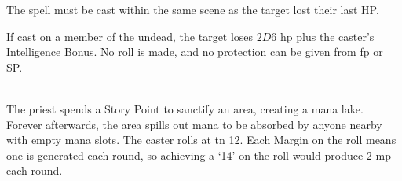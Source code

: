 \begin{multicols}{2}
The spell must be cast within the same scene as the target lost their last HP.

If cast on a member of the undead, the target loses $2D6$ \gls{hp} plus the caster's Intelligence Bonus.
No roll is made, and no protection can be given from \gls{fp} or \gls{SP}.

\\
The priest spends a Story Point to sanctify an area, creating a mana lake.
Forever afterwards, the area spills out mana to be absorbed by anyone nearby with empty mana slots.
The caster rolls at \gls{tn} 12.
Each Margin on the roll means one  is generated each round, so achieving a `14' on the roll would produce 2 \gls{mp} each round.

\end{multicols}


